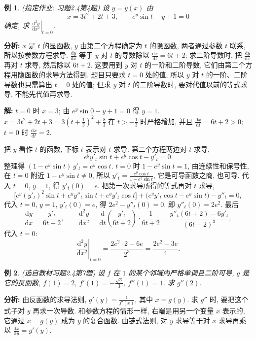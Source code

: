 \documentclass[UTF8,openany]{ctexbook}
\theoremstyle{chinesetextbook}
\newtheorem{example}{例}[section]
\newenvironment{cnsolution}{\par\indent\textbf{解:} \ignorespaces}{\par}
\newcommand{\dd}{\mathrm d}
\begin{document}
\begin{example}\label{ex:c2-h4-4}
\textnormal{(指定作业: 习题2.4第4题)} 设 $y=y(x)$ 由
\[
x=3t^2+2t+3,\qquad e^y\sin t-y+1=0
\]
确定, 求 $\displaystyle\left.\frac{\dd^2y}{\dd x^2}\right|_{t=0}$.
\end{example}
\par\indent\textbf{分析:} $x$ 是 $t$ 的显函数, $y$ 由第二个方程确定为 $t$ 的隐函数, 两者通过参数 $t$ 联系, 所以按参数方程求导. $\displaystyle\frac{\dd y}{\dd x}$ 等于 $y$ 对 $t$ 的导数除以 $\displaystyle\frac{\dd x}{\dd t}=6t+2$; 求二阶导数时, 把 $\displaystyle\frac{\dd y}{\dd x}$ 再对 $t$ 求导, 然后除以 $6t+2$. 这要用到 $y$ 对 $t$ 的一阶和二阶导数, 它们由第二个方程用隐函数的求导方法得到. 题目只要求 $t=0$ 处的值, 所以 $y$ 对 $t$ 的一阶、二阶导数也只需算出 $t=0$ 处的值; 但求 $y$ 对 $t$ 的二阶导数时, 要对代值以前的等式求导, 不能先代值再求导.
\begin{cnsolution}
$t=0$ 时 $x=3$; 由 $e^y\sin0-y+1=0$ 得 $y=1$. $\displaystyle x=3t^2+2t+3=3\left(t+\frac13\right)^2+\frac83$ 在 $\displaystyle t>-\frac13$ 时严格增加, 并且 $\displaystyle\frac{\dd x}{\dd t}=6t+2>0$; $t=0$ 时 $\displaystyle\frac{\dd x}{\dd t}=2$.

把 $y$ 看作 $t$ 的函数, 下标 $t$ 表示对 $t$ 求导. 第二个方程两边对 $t$ 求导,
\[
e^yy'_t\sin t+e^y\cos t-y'_t=0.
\]
整理得 $(1-e^y\sin t)\,y'_t=e^y\cos t$. $t=0$ 时 $1-e^y\sin t=1$, 由连续性和保号性, 在 $t=0$ 附近 $1-e^y\sin t\ne0$, 所以 $\displaystyle y'_t=\frac{e^y\cos t}{1-e^y\sin t}$, 它是可导函数之商, 也可导. 代入 $t=0$, $y=1$, 得 $y'_t(0)=e$. 把第一次求导所得的等式再对 $t$ 求导,
\[
\bigl[e^y(y'_t)^2\sin t+e^yy''_t\sin t+e^yy'_t\cos t\bigr]+\bigl(e^yy'_t\cos t-e^y\sin t\bigr)-y''_t=0,
\]
代入 $t=0$, $y=1$, $y'_t(0)=e$, 得 $2e^2-y''_t(0)=0$, 即 $y''_t(0)=2e^2$. 最后
\[
\frac{\dd y}{\dd x}=\frac{y'_t}{6t+2},\qquad\frac{\dd^2y}{\dd x^2}=\frac{\dd}{\dd t}\left(\frac{y'_t}{6t+2}\right)\cdot\frac1{6t+2}=\frac{y''_t(6t+2)-6y'_t}{(6t+2)^3},
\]
代入 $t=0$:
\[
\left.\frac{\dd^2y}{\dd x^2}\right|_{t=0}=\frac{2e^2\cdot2-6e}{2^3}=\frac{2e^2-3e}4.
\]
\end{cnsolution}
\begin{example}\label{ex:c2-h4-7}
\textnormal{(选自教材习题2.4第7题)} 设 $f$ 在 $1$ 的某个邻域内严格单调且二阶可导, $g$ 是它的反函数, $f(1)=2$, $\displaystyle f'(1)=-\frac{\sqrt3}3$, $f''(1)=1$. 求 $g''(2)$.
\end{example}
\par\indent\textbf{分析:} 由反函数的求导法则, $\displaystyle g'(y)=\frac1{f'(x)}$, 其中 $x=g(y)$. 求 $g''$ 时, 要把这个式子对 $y$ 再求一次导数. 和参数方程的情形一样, 右端是用另一个变量 $x$ 表示的, 它通过 $x=g(y)$ 成为 $y$ 的复合函数. 由链式法则, 对 $y$ 求导等于对 $x$ 求导再乘以 $\displaystyle\frac{\dd x}{\dd y}=g'(y)$.
\end{document}
